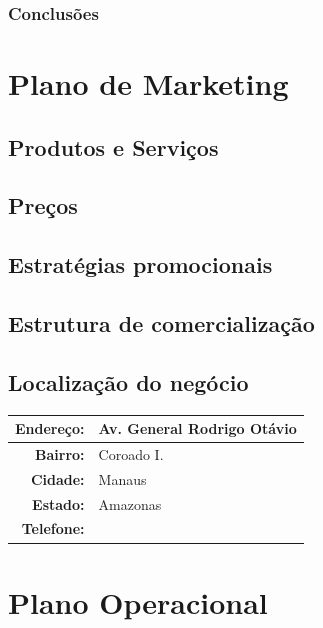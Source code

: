 \documentclass[
	12pt,				%
	openright,			%
	twoside,			%
	a4paper,			%
	english,			%
	french,				%
	spanish,			%
	brazil,				%
	]{abntex2}
\begin{document}
\subsection*{Conclusões}



\chapter{Plano de Marketing}

\section{Produtos e Serviços}


\section{Preços}

\section{Estratégias promocionais}

\section{Estrutura de comercialização}

\section{Localização do negócio}

\begin{center}
	\begin{tabular}{|r|p{12cm}|}
		\hline
		\textbf{Endereço:}	& Av. General Rodrigo Otávio \\ \hline
		\textbf{Bairro:}	& Coroado I. \\ \hline
		\textbf{Cidade:}	& Manaus \\ \hline
		\textbf{Estado:}	& Amazonas \\ \hline
		\textbf{Telefone:}	&  \\ \hline
	\end{tabular}
\end{center}



\chapter{Plano Operacional}
\end{document}
